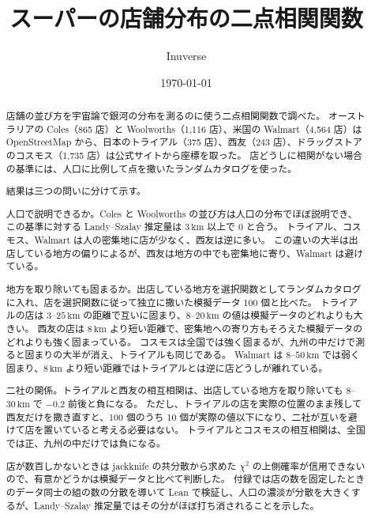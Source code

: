 \documentclass[a4paper,11pt]{ltjsarticle}
\title{\textbf{スーパーの店舗分布の二点相関関数}}
\author{Inuverse}
\date{\today}
\begin{document}
\maketitle

\begin{abstract}
店舗の並び方を宇宙論で銀河の分布を測るのに使う二点相関関数で調べた。
オーストラリアの Coles（865 店）と Woolworths（1,116 店）、米国の Walmart（4,564 店）は OpenStreetMap から、日本のトライアル（375 店）、西友（243 店）、ドラッグストアのコスモス（1,735 店）は公式サイトから座標を取った。
店どうしに相関がない場合の基準には、人口に比例して点を撒いたランダムカタログを使った。

結果は三つの問いに分けて示す。

人口で説明できるか。Coles と Woolworths の並び方は人口の分布でほぼ説明でき、この基準に対する Landy--Szalay 推定量は $3\,\mathrm{km}$ 以上で $0$ と合う。
トライアル、コスモス、Walmart は人の密集地に店が少なく、西友は逆に多い。
この違いの大半は出店している地方の偏りによるが、西友は地方の中でも密集地に寄り、Walmart は避けている。

地方を取り除いても固まるか。出店している地方を選択関数としてランダムカタログに入れ、店を選択関数に従って独立に撒いた模擬データ 100 個と比べた。
トライアルの店は $3$--$25\,\mathrm{km}$ の距離で互いに固まり、$8$--$20\,\mathrm{km}$ の値は模擬データのどれよりも大きい。
西友の店は $8\,\mathrm{km}$ より短い距離で、密集地への寄り方もそろえた模擬データのどれよりも強く固まっている。
コスモスは全国では強く固まるが、九州の中だけで測ると固まりの大半が消え、トライアルも同じである。
Walmart は $8$--$50\,\mathrm{km}$ では弱く固まり、$8\,\mathrm{km}$ より短い距離ではトライアルとは逆に店どうしが離れている。

二社の関係。トライアルと西友の相互相関は、出店している地方を取り除いても $8$--$30\,\mathrm{km}$ で $-0.2$ 前後と負になる。
ただし、トライアルの店を実際の位置のまま残して西友だけを撒き直すと、100 個のうち 10 個が実際の値以下になり、二社が互いを避けて店を置いていると考える必要はない。
トライアルとコスモスの相互相関は、全国では正、九州の中だけでは負になる。

店が数百しかないときは jackknife の共分散から求めた $\chi^2$ の上側確率が信用できないので、有意かどうかは模擬データと比べて判断した。
付録では店の数を固定したときのデータ同士の組の数の分散を導いて Lean で検証し、人口の濃淡が分散を大きくするが、Landy--Szalay 推定量ではその分がほぼ打ち消されることを示した。
\end{abstract}

\clearpage
\tableofcontents
\clearpage
\end{document}
